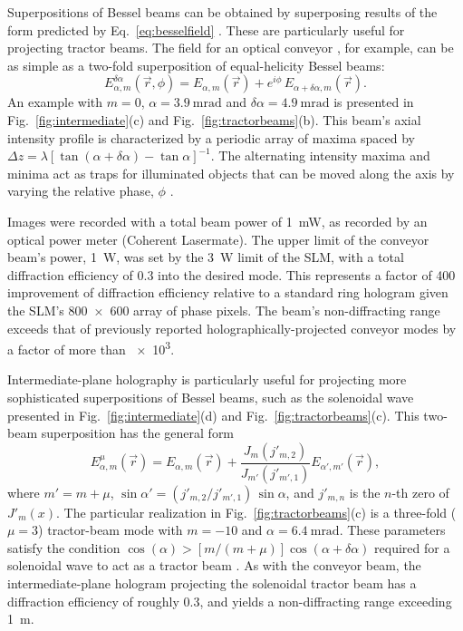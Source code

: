 Superpositions of Bessel beams can be obtained
by superposing results of the form predicted
by Eq.~\eqref{eq:besselfield} \cite{mcgloin03b}.
These are particularly useful for projecting
tractor beams.
The field for an optical conveyor
\cite{cizmar05,ruffner12a,ruffner14},
for example, can be as simple as a two-fold superposition
of equal-helicity Bessel beams:
\begin{equation}
  \label{eq:conveyorfield}
  E_{\alpha,m}^{\delta \alpha}(\vec{r},\phi)
  =
  E_{\alpha,m}(\vec{r})
  +
  e^{i \phi} \,
  E_{\alpha+\delta\alpha,m}(\vec{r}).
\end{equation}
An example with $m = 0$, $\alpha = \SI{3.9}{\milli\radian}$
and $\delta \alpha = \SI{4.9}{\milli\radian}$
is presented in Fig.~\ref{fig:intermediate}(c) and Fig.~\ref{fig:tractorbeams}(b).
This beam's axial intensity profile is characterized by
a periodic array of maxima spaced by
$\Delta z = \lambda [\tan (\alpha + \delta\alpha) - \tan
\alpha]^{-1}$.
The alternating intensity maxima and minima act as
traps for illuminated objects that can be moved
along the axis by
varying the relative phase, $\phi$
\cite{cizmar05,ruffner12a,ruffner14}.

Images were recorded with a total beam power of \SI{1}{\milli\watt},
as recorded by an optical power meter (Coherent Lasermate).
The upper limit of the conveyor beam's power, \SI{1}{\watt}, was
set by the \SI{3}{\watt} limit of the SLM, with a total diffraction
efficiency of \num{0.3} into the desired mode.
This represents a factor of \num{400} improvement of diffraction
efficiency relative to a standard ring hologram
\cite{ruffner12a,ruffner14}
given the SLM's \num{800 x 600} array of phase pixels.
The beam's non-diffracting range exceeds that of previously
reported holographically-projected conveyor modes
\cite{ruffner12a,ruffner14}
by a factor of more than \num{e3}.

Intermediate-plane holography is particularly useful for projecting
more sophisticated superpositions of Bessel beams, such
as the solenoidal wave presented in Fig.~\ref{fig:intermediate}(d) and
Fig.~\ref{fig:tractorbeams}(c).
This two-beam superposition has the general form
\begin{equation}
  \label{eq:solenoid}
  E_{\alpha,m}^{\mu}(\vec{r})
  =
  E_{\alpha,m}(\vec{r})
  +
  \frac{J_m(j'_{m,2})}{J_{m'}(j'_{m',1})}
  E_{\alpha',m'}(\vec{r}),
\end{equation}
where $m' = m + \mu$,
$\sin\alpha' = (j'_{m,2}/j'_{m',1}) \, \sin\alpha$, and
$j'_{m,n}$ is the $n$-th zero of $J'_m(x)$.
The particular realization in Fig.~\ref{fig:tractorbeams}(c)
is a three-fold ($\mu = 3$) tractor-beam mode \cite{yevick16}
with $m = -10$ and $\alpha = \SI{6.4}{\milli\radian}$.
These parameters satisfy the condition
$\cos(\alpha) > [m/(m + \mu)] \cos(\alpha + \delta \alpha)$
required for a solenoidal wave to act as a tractor beam
\cite{yevick16}.
As with the conveyor beam, the intermediate-plane hologram
projecting the solenoidal tractor beam has a diffraction
efficiency of roughly \num{0.3}, and yields a non-diffracting
range exceeding \SI{1}{\meter}.

